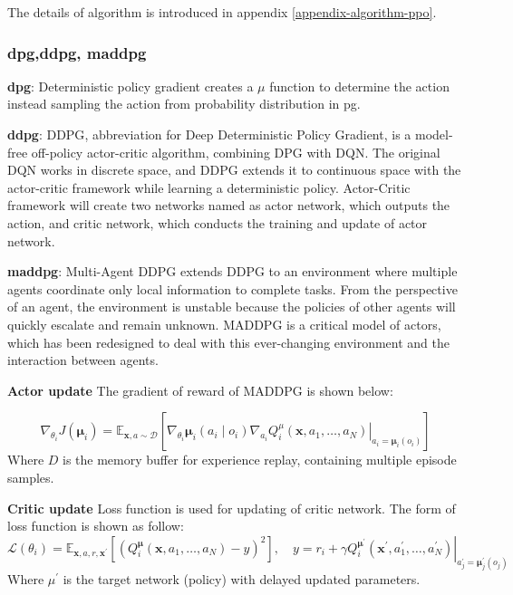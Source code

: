 The details of algorithm is introduced in appendix \ref{appendix-algorithm-ppo}.

\subsubsection{\gls{dpg},\gls{ddpg}, \gls{maddpg}} \label{background:maddpg}

\textbf{\gls{dpg}}: Deterministic policy gradient creates a $\mu$ function to determine the action instead sampling the action from probability distribution in \gls{pg}.

\textbf{\gls{ddpg}}: DDPG\parencite{Lillicrap2015}, abbreviation for Deep Deterministic Policy Gradient, is a model-free off-policy actor-critic algorithm, combining DPG with DQN. The original DQN works in discrete space, and DDPG extends it to continuous space with the actor-critic framework while learning a deterministic policy. Actor-Critic framework will create two networks named as actor network, which outputs the action, and critic network, which conducts the training and update of actor network.

\textbf{\gls{maddpg}}: Multi-Agent DDPG\parencite{maddpg2017} extends DDPG to an environment where multiple agents coordinate only local information to complete tasks. From the perspective of an agent, the environment is unstable because the policies of other agents will quickly escalate and remain unknown. MADDPG is a critical model of actors, which has been redesigned to deal with this ever-changing environment and the interaction between agents. 

\textbf{Actor update} The gradient of reward of MADDPG is shown below:

\begin{equation}
\nabla_{\theta_{i}} J\left(\boldsymbol{\mu}_{i}\right)=\mathbb{E}_{\mathbf{x}, a \sim \mathcal{D}}\left[\left.\nabla_{\theta_{i}} \boldsymbol{\mu}_{i}\left(a_{i} \mid o_{i}\right) \nabla_{a_{i}} Q_{i}^{\mu}\left(\mathbf{x}, a_{1}, \ldots, a_{N}\right)\right|_{a_{i}=\boldsymbol{\mu}_{i}\left(o_{i}\right)}\right]
\end{equation}
Where $D$ is the memory buffer for experience replay, containing multiple episode samples.

\textbf{Critic update} Loss function is used for updating of critic network. The form of loss function is shown as follow:
\begin{equation}
\mathcal{L}\left(\theta_{i}\right)=\mathbb{E}_{\mathbf{x}, a, r, \mathbf{x}^{\prime}}\left[\left(Q_{i}^{\boldsymbol{\mu}}\left(\mathbf{x}, a_{1}, \ldots, a_{N}\right)-y\right)^{2}\right], \quad y=r_{i}+\left.\gamma Q_{i}^{\boldsymbol{\mu}^{\prime}}\left(\mathbf{x}^{\prime}, a_{1}^{\prime}, \ldots, a_{N}^{\prime}\right)\right|_{a_{j}^{\prime}=\boldsymbol{\mu}_{j}^{\prime}\left(o_{j}\right)}
\end{equation}
Where $\mu^{\prime}$ is the target network (policy) with delayed updated parameters.

